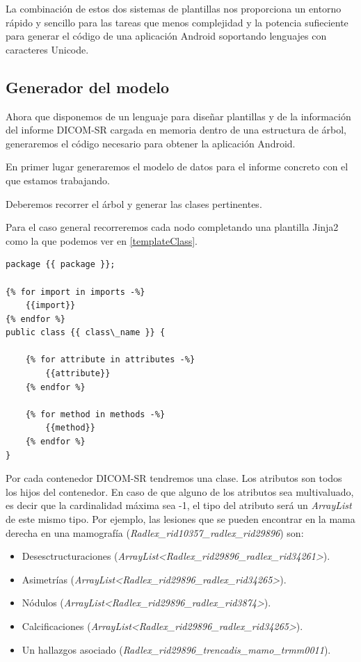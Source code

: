 La combinación de estos dos sistemas de plantillas nos proporciona un entorno rápido y sencillo para las tareas que menos complejidad y la potencia sufieciente para generar el código de una aplicación Android soportando lenguajes con caracteres Unicode.\par

\subsection{Generador del modelo}\label{sec:generacion}
Ahora que disponemos de un lenguaje para diseñar plantillas y de la información del informe DICOM-SR cargada en memoria dentro de una estructura de árbol, generaremos el código necesario para obtener la aplicación Android.\medskip\par

En primer lugar generaremos el modelo de datos para el informe concreto con el que estamos trabajando.\par
Deberemos recorrer el árbol y generar las clases pertinentes.\par
Para el caso general recorreremos cada nodo completando una plantilla Jinja2 como la que podemos ver en \ref{templateClass}.\par
\lstset{escapechar=@,style=java}

\begin{lstlisting}[label=templateClass,caption=Plantilla para una clase genérica]
package {{ package }};

{% for import in imports -%}
    {{import}}
{% endfor %}
public class {{ class\_name }} {

    {% for attribute in attributes -%}
        {{attribute}}
    {% endfor %}

    {% for method in methods -%}
        {{method}}
    {% endfor %}
}
\end{lstlisting}

 Por cada contenedor DICOM-SR tendremos una clase. Los atributos son todos los hijos del contenedor. En caso de que alguno de los atributos sea multivaluado, es decir que la cardinalidad máxima sea -1, el tipo del atributo será un \textit{ArrayList} de este mismo tipo. Por ejemplo, las lesiones que se pueden encontrar en la mama derecha en una mamografía  (\emph{Radlex\_rid10357\_radlex\_rid29896}) son: 
\begin{itemize}
\item Desesctructuraciones (\emph{ArrayList<Radlex\_rid29896\_radlex\_rid34261>}).
\item Asimetrías (\emph{ArrayList<Radlex\_rid29896\_radlex\_rid34265>}).
\item Nódulos (\emph{ArrayList<Radlex\_rid29896\_radlex\_rid3874>}).
\item Calcificaciones (\emph{ArrayList<Radlex\_rid29896\_radlex\_rid34265>}).
\item Un hallazgos asociado (\emph{Radlex\_rid29896\_trencadis\_mamo\_trmm0011}).
\end{itemize}

